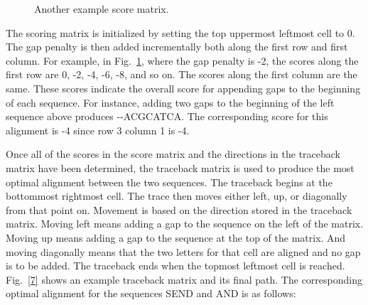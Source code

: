 \documentclass[conference]{IEEEtran}
\begin{document}
\begin{figure}[htbp]
\centerline{}
\caption{Another example score matrix. \cite{musso}}
\label{6}
\end{figure}

The scoring matrix is initialized by setting the top uppermost leftmost cell to 0. The gap penalty is then added incrementally both along the first row and first column. For example, in Fig.~\ref{6}, where the gap penalty is -2, the scores along the first row are 0, -2, -4, -6, -8, and so on. The scores along the first column are the same. These scores indicate the overall score for appending gaps to the beginning of each sequence. For instance, adding two gaps to the beginning of the left sequence above produces -{}-ACGCATCA. The corresponding score for this alignment is -4 since row 3 column 1 is -4.

Once all of the scores in the score matrix and the directions in the traceback matrix have been determined, the traceback matrix is used to produce the most optimal alignment between the two sequences. The traceback begins at the bottommost rightmost cell. The trace then moves either left, up, or diagonally from that point on. Movement is based on the direction stored in the traceback matrix. Moving left means adding a gap to the sequence on the left of the matrix. Moving up means adding a gap to the sequence at the top of the matrix. And moving diagonally means that the two letters for that cell are aligned and no gap is to be added. The traceback ends when the topmost leftmost cell is reached. Fig.~\ref{7} shows an example traceback matrix and its final path. The corresponding optimal alignment for the sequences SEND and AND is as follows:\\
\end{document}
